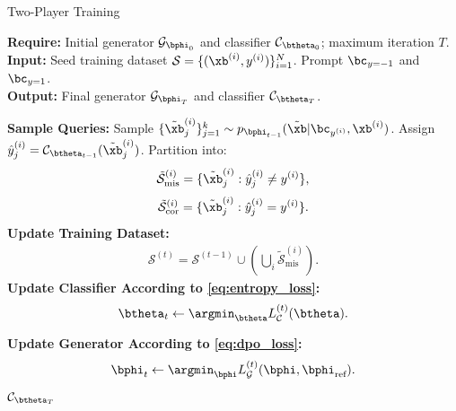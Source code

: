 \begin{algorithm}[ht]
\caption{Two-Player Training}
\label{alg:adversarial-training}
\textbf{Require:} Initial generator $\mathcal{G}_{\bphi_0}$ and classifier $\mathcal{C}_{\btheta_0}$; maximum iteration $T$. \\
\textbf{Input:} Seed training dataset $\mathcal{S} = \{(\xb^{(i)}, y^{(i)})\}_{i=1}^N$. Prompt $\bc_{y=-1}$ and $\bc_{y=1}$.\\
\textbf{Output:} Final generator $\mathcal{G}_{\bphi_T}$ and classifier $\mathcal{C}_{\btheta_T}$.
\begin{algorithmic}[1]
    \State \textbf{Sample Queries:}
        \State Sample $\{\tilde{\xb}_j^{(i)}\}_{j=1}^k \sim p_{\bphi_{t-1}}(\tilde{\xb} | \bc_{y^{(i)}},\xb^{(i)})$.
        \State Assign $\hat{y}_j^{(i)} = \mathcal{C}_{\btheta_{t-1}}(\tilde{\xb}_j^{(i)})$.
        \State Partition into:
        \[
        \tilde{\mathcal{S}}_{\text{mis}}^{(i)} = \{\tilde{\xb}_j^{(i)} : \hat{y}_j^{(i)} \neq y^{(i)}\},\]
        \[\tilde{\mathcal{S}}_{\text{cor}}^{(i)} = \{\tilde{\xb}_j^{(i)} : \hat{y}_j^{(i)} = y^{(i)}\}.
        \]
    \EndFor
    \State \textbf{Update Training Dataset:
    }
    \begin{align*}
        \mathcal{S}^{(t)} = \mathcal{S}^{(t-1)} \cup \left( \bigcup_{i}\tilde{\mathcal{S}}^{(i)}_{\text{mis}}\right).
    \end{align*}
    \State \textbf{Update Classifier According to \eqref{eq:entropy_loss}:}
    \[
    \btheta_t \gets \argmin_{\btheta} L^{(t)}_{\mathcal{C}}(\btheta).
    \]

    \State \textbf{Update Generator According to \eqref{eq:dpo_loss}:}
    \begin{align*}
        \bphi_t \gets \argmin_{\bphi} L^{(t)}_{\mathcal{G}}(\bphi, \bphi_{\text{ref}}).
    \end{align*}

\EndFor
\State \Return $\mathcal{C}_{\btheta_T}$
\end{algorithmic}
\end{algorithm}

